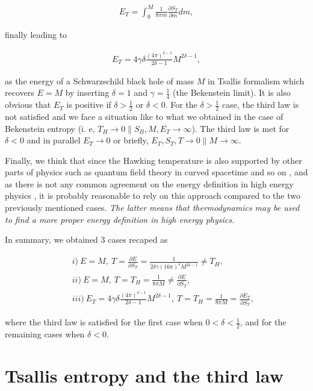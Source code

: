 \documentclass[twocolumn,preprintnumbers,amsmath,nofootinbib,amssymb]{revtex4}
\begin{document}
\begin{eqnarray}
E_T=\int_0^M\frac{1}{8\pi m}\frac{\partial S_T}{\partial m}dm,
\end{eqnarray}

\noindent finally leading to

\begin{eqnarray}\label{3}
E_T=4\gamma\delta\frac{(4\pi)^{\delta-1}}{2\delta-1}M^{2\delta-1},
\end{eqnarray}

\noindent as the energy of a Schwarzschild black hole of mass $M$
in Tsallis formalism which recovers $E=M$ by inserting $\delta=1$
and $\gamma=\frac{1}{4}$ (the Bekenstein limit). It is also
obvious that $E_T$ is positive if $\delta>\frac{1}{2}$ or
$\delta<0$. For the $\delta>\frac{1}{2}$ case, the third law is
not satisfied and we face a situation like to what we obtained in
the case of Bekenstein entropy (i. e, $T_H\rightarrow0\parallel
S_B,M,E_T\rightarrow\infty$). The third law is met for $\delta<0$
and in parallel $E_T\rightarrow0$ or briefly,
$E_T,S_T,T\rightarrow0\parallel M\rightarrow\infty$.

Finally, we think that since the Hawking temperature is also
supported by other parts of physics such as quantum field theory
in curved spacetime and so on \cite{haw,bek,thes}, and as there is
not any common agreement on the energy definition in high energy
physics \cite{energy,energy1}, it is probably reasonable to rely
on this approach compared to the two previously mentioned cases.
\textit{The latter means that thermodynamics may be used to find a
more proper energy definition in high energy physics.}

In summary, we obtained $3$ cases recaped as

\begin{eqnarray}\label{8}
&&\!\!\!\!i)\ E=M,\ T=\frac{\partial E}{\partial S_T}=\frac{1}{2\delta\gamma(16\pi)^\delta M^{2\delta-1}}\neq T_H,\nonumber\\
&&\!\!\!\!ii)\ E=M,\ T=T_H=\frac{1}{8\pi M}\neq\frac{\partial E}{\partial S_T},\\\nonumber
&&\!\!\!\!\!\!\!\!iii)\ E_T=4\gamma\delta\frac{(4\pi)^{\delta-1}}{2\delta-1}M^{2\delta-1},\ T=T_H=\frac{1}{8\pi M}=\frac{\partial E_T}{\partial S_T},
\end{eqnarray}

\noindent where the third law is satisfied for the first case when
$0<\delta<\frac{1}{2}$, and for the remaining cases when
$\delta<0$.

\section{Tsallis entropy and the third law}
\end{document}
